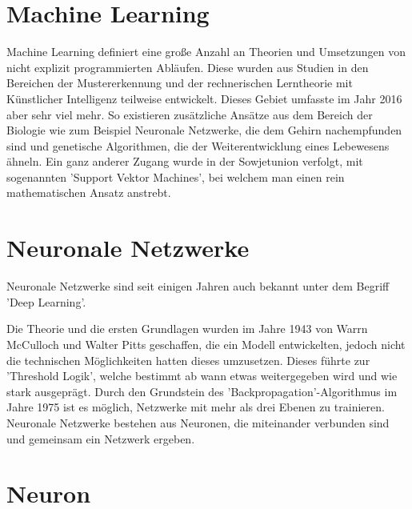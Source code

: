 \section{Machine Learning}
\label{sec:Machine Learning}

Machine Learning definiert eine große Anzahl an Theorien und Umsetzungen von nicht explizit programmierten Abläufen. 
Diese wurden aus Studien in den Bereichen der Mustererkennung und der rechnerischen Lerntheorie mit Künstlicher Intelligenz teilweise entwickelt. 
Dieses Gebiet umfasste im Jahr 2016 aber sehr viel mehr. 
So existieren zusätzliche Ansätze aus dem Bereich der Biologie wie zum Beispiel Neuronale Netzwerke, die dem Gehirn nachempfunden sind und genetische Algorithmen, die der Weiterentwicklung eines Lebewesens ähneln. 
Ein ganz anderer Zugang wurde in der Sowjetunion verfolgt, mit sogenannten 'Support Vektor Machines', bei welchem man einen rein mathematischen Ansatz anstrebt. \cite{lampropoulos2015machine}

\section{Neuronale Netzwerke}

Neuronale Netzwerke sind seit einigen Jahren auch bekannt unter dem Begriff 'Deep Learning'. \newline

\noindent 
Die Theorie und die ersten Grundlagen wurden im Jahre 1943 von Warrn McCulloch und Walter Pitts geschaffen, die ein Modell entwickelten, jedoch nicht die technischen Möglichkeiten hatten dieses umzusetzen.
Dieses %
führte zur 'Threshold Logik', welche bestimmt ab wann etwas weitergegeben wird und wie stark ausgeprägt. \cite{rojas2013neural}
Durch den Grundstein des 'Backpropagation'-Algorithmus im Jahre 1975 ist es möglich, Netzwerke mit mehr als drei Ebenen zu trainieren. 
Neuronale Netzwerke bestehen aus Neuronen, die miteinander verbunden sind und gemeinsam ein Netzwerk ergeben. \cite{AI3} %



\section{Neuron}
\label{sec:Neuron}

